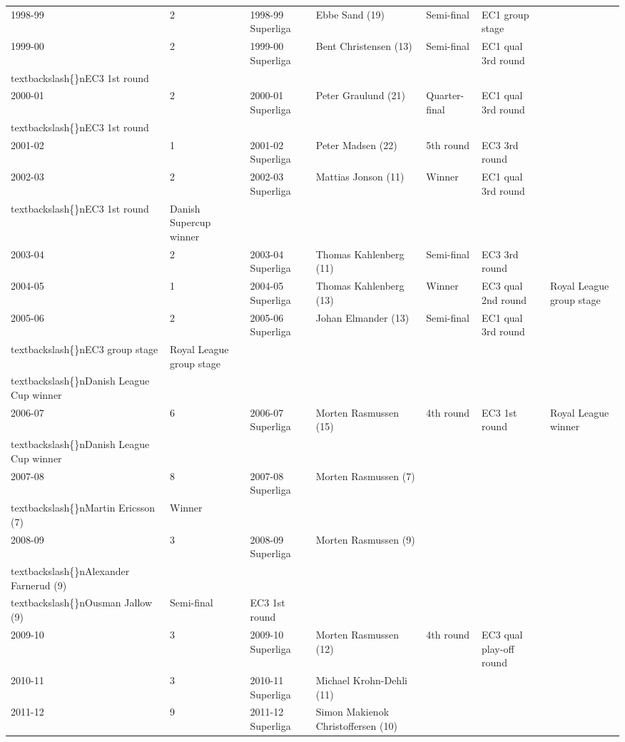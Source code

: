 \documentclass{article}
\begin{document}
\begin{tabular}{lllllll}
1998-99 & 2 & 1998-99 Superliga & Ebbe Sand (19) & Semi-final & EC1 group stage &  \\
1999-00 & 2 & 1999-00 Superliga & Bent Christensen (13) & Semi-final & EC1 qual 3rd round\\textbackslash\{\}nEC3 1st round &  \\
2000-01 & 2 & 2000-01 Superliga & Peter Graulund (21) & Quarter-final & EC1 qual 3rd round\\textbackslash\{\}nEC3 1st round &  \\
2001-02 & 1 & 2001-02 Superliga & Peter Madsen (22) & 5th round & EC3 3rd round &  \\
2002-03 & 2 & 2002-03 Superliga & Mattias Jonson (11) & Winner & EC1 qual 3rd round\\textbackslash\{\}nEC3 1st round & Danish Supercup winner \\
2003-04 & 2 & 2003-04 Superliga & Thomas Kahlenberg (11) & Semi-final & EC3 3rd round &  \\
2004-05 & 1 & 2004-05 Superliga & Thomas Kahlenberg (13) & Winner & EC3 qual 2nd round & Royal League group stage \\
2005-06 & 2 & 2005-06 Superliga & Johan Elmander (13) & Semi-final & EC1 qual 3rd round\\textbackslash\{\}nEC3 group stage & Royal League group stage\\textbackslash\{\}nDanish League Cup winner \\
2006-07 & 6 & 2006-07 Superliga & Morten Rasmussen (15) & 4th round & EC3 1st round & Royal League winner\\textbackslash\{\}nDanish League Cup winner \\
2007-08 & 8 & 2007-08 Superliga & Morten Rasmussen (7)\\textbackslash\{\}nMartin Ericsson (7) & Winner &  &  \\
2008-09 & 3 & 2008-09 Superliga & Morten Rasmussen (9)\\textbackslash\{\}nAlexander Farnerud (9)\\textbackslash\{\}nOusman Jallow (9) & Semi-final & EC3 1st round &  \\
2009-10 & 3 & 2009-10 Superliga & Morten Rasmussen (12) & 4th round & EC3 qual play-off round &  \\
2010-11 & 3 & 2010-11 Superliga & Michael Krohn-Dehli (11) &  &  &  \\
2011-12 & 9 & 2011-12 Superliga & Simon Makienok Christoffersen (10) &  &  &  \\
\bottomrule
\end{tabular}
\end{document}
